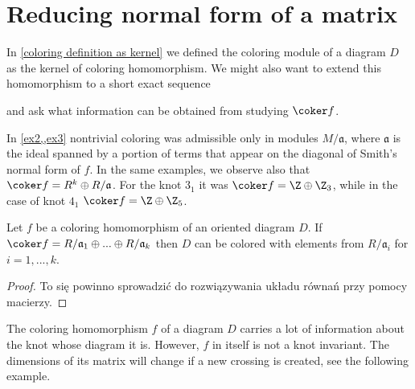 \section{Reducing normal form of a matrix}

In \cref{coloring definition as kernel} we defined the coloring module of a diagram $D$ as the kernel of coloring homomorphism. We might also want to extend this homomorphism to a short exact sequence
\begin{center}
\end{center}
and ask what information can be obtained from studying $\coker f$.

In \cref{ex2,,ex3} nontrivial coloring was admissible only in modules $M/\mathfrak{a}$, where $\mathfrak{a}$ is the ideal spanned by a portion of terms that appear on the diagonal of Smith's normal form of $f$. In the same examples, we observe also that $\coker f=R^k\oplus R/\mathfrak{a}$. For the knot $3_1$ it was $\coker f=\Z\oplus \Z_3$, while in the case of knot $4_1$ $\coker f=\Z\oplus \Z_5$.

\begin{proposition}
  Let $f$ be a coloring homomorphism of an oriented diagram $D$. If $\coker f=R/\mathfrak{a}_1\oplus...\oplus R/\mathfrak{a}_k$ then $D$ can be colored with elements from $R/\mathfrak{a}_i$ for $i=1,..., k$.
\end{proposition}

\begin{proof}
  {\color{red}To się powinno sprowadzić do rozwiązywania układu równań przy pomocy macierzy}.
\end{proof}

The coloring homomorphism $f$ of a diagram $D$ carries a lot of information about the knot whose diagram it is. However, $f$ in itself is not a knot invariant. The dimensions of its matrix will change if a new crossing is created, see the following example.

